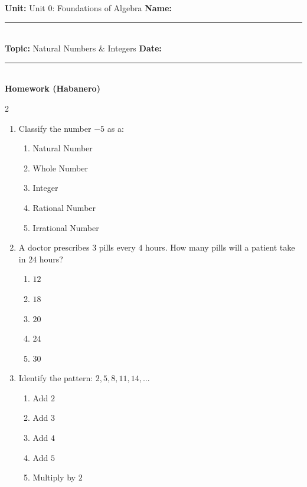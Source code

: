 \documentclass[10pt]{article}
\begin{document}
\enlargethispage{2.5cm}

\begin{tcolorbox}[colback=mainblue!5, colframe=mainblue, sharp corners, boxrule=0.5pt]
    \small \textbf{Unit:} Unit 0: Foundations of Algebra \hfill \textbf{Name:} \rule{3cm}{0.4pt} \\
    \small \textbf{Topic:} Natural Numbers & Integers \hfill \textbf{Date:} \rule{2cm}{0.4pt} \\
    \centering \textbf{\large Homework (Habanero)}
\end{tcolorbox}

\vspace{0.2cm}

\begin{multicols}{2}
\begin{enumerate}[label=\textbf{Q\arabic*.}, leftmargin=*, itemsep=6pt, parsep=0pt]

  \item \small Classify the number $-5$ as a:
  \begin{enumerate}[label=(\Alph*), leftmargin=0.6cm, nosep, itemsep=2pt]
    \item Natural Number
    \item Whole Number
    \item Integer
    \item Rational Number
    \item Irrational Number
  \end{enumerate}

  \item \small A doctor prescribes $3$ pills every $4$ hours. How many pills will a patient take in $24$ hours?
  \begin{enumerate}[label=(\Alph*), leftmargin=0.6cm, nosep, itemsep=2pt]
    \item $12$
    \item $18$
    \item $20$
    \item $24$
    \item $30$
  \end{enumerate}

  \item \small Identify the pattern: $2, 5, 8, 11, 14, ...$
  \begin{enumerate}[label=(\Alph*), leftmargin=0.6cm, nosep, itemsep=2pt]
    \item Add $2$
    \item Add $3$
    \item Add $4$
    \item Add $5$
    \item Multiply by $2$
  \end{enumerate}


\end{enumerate}
\end{multicols}
\end{document}
